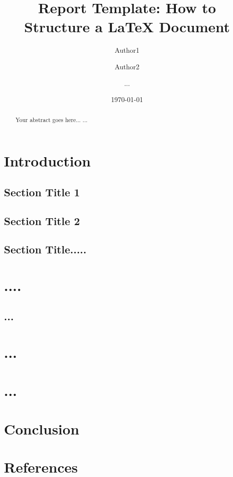 \documentclass[11pt,a4paper]{report}
\begin{document}
\title{Report Template: How to Structure a LaTeX Document}
\author{Author1 \and Author2 \and ...}
\date{\today}
\maketitle

\begin{abstract}
Your abstract goes here...
...
\end{abstract}

\chapter{Introduction}
\section{Section Title 1}
\section{Section Title 2}
\section{Section Title.....}

\chapter{....}



\section{...}
\chapter{...}


\chapter{...}


\chapter{Conclusion}


\chapter*{References}
\end{document}
